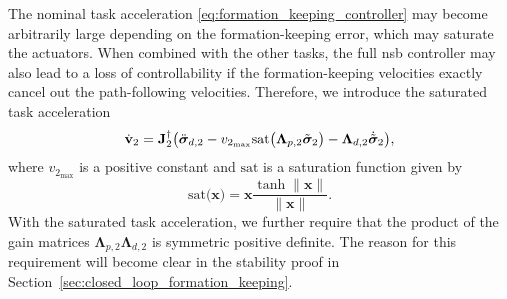
The nominal task acceleration \eqref{eq:formation_keeping_controller} may become arbitrarily large depending on the formation-keeping error, which may saturate the actuators. When combined with the other tasks, the full \gls{nsb} controller may also lead to a loss of controllability if the formation-keeping velocities exactly cancel out the path-following velocities. Therefore, we introduce the saturated task acceleration
\begin{equation}\label{eq:saturated_formation_keeping}
\dot{\mathbf{v}}_2 = \mathbf{J}_2^\dagger \bigl(\ddot{\bm{\sigma}}_{d,2} - v_{2_{\max}}\mathrm{sat}\bigl(\mathbf{\Lambda}_{p,2}\Tilde{\bm{\sigma}}_2\bigr) - \mathbf{\Lambda}_{d,2} \dot{\Tilde{\bm{\sigma}}}_2\bigl),
\end{equation}
where $v_{2_{\max}}$ is a positive constant and $\mathrm{sat}$ is a saturation function given by
\begin{equation}\label{eq:saturation_function}
    \mathrm{sat}\bigl(\mathbf{x}\bigr) = \mathbf{x}\frac{\tanh{\|\mathbf{x}\|}}{\|\mathbf{x}\|}.
\end{equation}
With the saturated task acceleration, we further require that the product of the gain matrices $\mathbf{\Lambda}_{p,2} \mathbf{\Lambda}_{d,2}$ is symmetric positive definite. The reason for this requirement will become clear in the stability proof in Section~\ref{sec:closed_loop_formation_keeping}.

